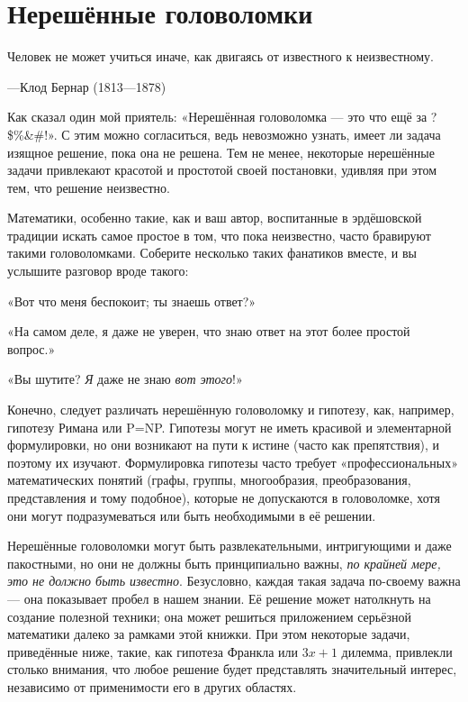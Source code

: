 \chapter*{Нерешённые головоломки}

\setlength{\epigraphwidth}{.55\textwidth}
\epigraph{Человек не может учиться иначе, как двигаясь от известного к неизвестному.}{---Клод Бернар (1813---1878)}

Как сказал один мой приятель: «Нерешённая головоломка --- это что ещё за ?\$\%\&\#\@!».
С этим можно согласиться, ведь невозможно узнать, имеет ли задача изящное решение, пока она не решена.
Тем не менее, некоторые нерешённые задачи привлекают красотой и простотой своей постановки, удивляя при этом тем, что решение неизвестно.

Математики, особенно такие, как и ваш автор, воспитанные в эрдёшовской традиции искать самое простое в том, что пока неизвестно, часто бравируют такими головоломками.
Соберите несколько таких фанатиков вместе, и вы услышите разговор вроде такого:

«Вот что меня беспокоит; ты знаешь ответ?»

«На самом деле, я даже не уверен, что знаю ответ на этот более простой вопрос.»

«Вы шутите? \emph{Я} даже не знаю \emph{вот этого}!»

Конечно, следует различать нерешённую головоломку и гипотезу, как, например, гипотезу Римана или P=NP.
Гипотезы могут не иметь красивой и элементарной формулировки, но они возникают на пути к истине (часто как препятствия), и поэтому их изучают.
Формулировка гипотезы часто требует «профессиональных» математических понятий (графы, группы, многообразия, преобразования, представления и тому подобное), которые не допускаются в головоломке, хотя они могут подразумеваться или быть необходимыми в её решении.

Нерешённые головоломки могут быть развлекательными, интригующими и даже пакостными,
но они не должны быть принципиально важны, \emph{по крайней мере, это не должно быть известно}.
Безусловно, каждая такая задача по-своему важна --- она показывает пробел в нашем знании.
Её решение может натолкнуть на создание полезной техники;
она может решиться приложением серьёзной математики далеко за рамками этой книжки.
При этом некоторые задачи, приведённые ниже, такие, как гипотеза Франкла или $3x+1$ дилемма, привлекли столько внимания, что любое решение будет представлять значительный интерес, независимо от применимости его в других областях.

